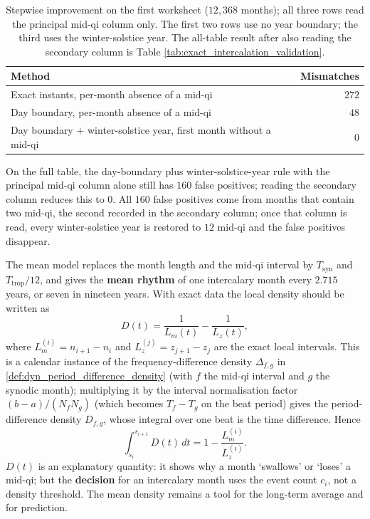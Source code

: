 \begin{table}[htbp]
\centering
\caption{Stepwise improvement on the first worksheet (\(12{,}368\) months); all three rows read the principal mid-qi column only. The first two rows use no year boundary; the third uses the winter-solstice year. The all-table result after also reading the secondary column is Table \ref{tab:exact_intercalation_validation}.}
\label{tab:exact_intercalation_comparison}
\begin{tabular}{@{}p{9.6cm}r@{}}
\toprule
Method & Mismatches \\
\midrule
Exact instants, per-month absence of a mid-qi & \(272\) \\
Day boundary, per-month absence of a mid-qi & \(48\) \\
Day boundary \(+\) winter-solstice year, first month without a mid-qi & \(0\) \\
\bottomrule
\end{tabular}
\end{table}

On the full table, the day-boundary plus winter-solstice-year rule with the principal mid-qi column alone still has \(160\) false positives; reading the secondary column reduces this to \(0\). All \(160\) false positives come from months that contain two mid-qi, the second recorded in the secondary column; once that column is read, every winter-solstice year is restored to \(12\) mid-qi and the false positives disappear.

\begin{remark}
\label{rem:exact_vs_mean_density}
The mean model replaces the month length and the mid-qi interval by \(T_{\text{syn}}\) and \(T_{\text{trop}}/12\), and gives the \textbf{mean rhythm} of one intercalary month every \(2.715\) years, or seven in nineteen years. With exact data the local density should be written as
\[
D(t)=\frac{1}{L_m(t)}-\frac{1}{L_z(t)},
\]
where \(L_m^{(i)}=n_{i+1}-n_i\) and \(L_z^{(j)}=z_{j+1}-z_j\) are the exact local intervals. This is a calendar instance of the frequency-difference density \(\Delta_{f,g}\) in \cref{def:dyn_period_difference_density} (with \(f\) the mid-qi interval and \(g\) the synodic month); multiplying it by the interval normalisation factor \((b-a)/(N_fN_g)\) (which becomes \(T_f-T_g\) on the beat period) gives the period-difference density \(D_{f,g}\), whose integral over one beat is the time difference. Hence
\[
\int_{s_i}^{s_{i+1}}D(t)\,dt
=1-\frac{L_m^{(i)}}{L_z^{(i)}}.
\]
\(D(t)\) is an explanatory quantity: it shows why a month `swallows' or `loses' a mid-qi; but the \textbf{decision} for an intercalary month uses the event count \(c_i\), not a density threshold. The mean density remains a tool for the long-term average and for prediction.
\end{remark}


